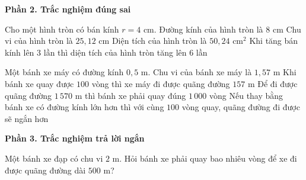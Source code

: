 \textbf{Phần 2. Trắc nghiệm đúng sai}

\begin{ex} %
Cho một hình tròn có bán kính $r = 4\text{ cm}$.
\choiceTF
{\True Đường kính của hình tròn là $8\text{ cm}$}
{\True Chu vi của hình tròn là $25{,}12\text{ cm}$}
{\True Diện tích của hình tròn là $50{,}24\text{ cm}^2$}
{Khi tăng bán kính lên $3$ lần thì diện tích của hình tròn tăng lên $6$ lần}
\end{ex}

\begin{ex} %
Một bánh xe máy có đường kính $0{,}5\text{ m}$.
\choiceTF
{\True Chu vi của bánh xe máy là $1{,}57\text{ m}$}
{\True Khi bánh xe quay được $100$ vòng thì xe máy đi được quãng đường $157\text{ m}$}
{\True Để đi được quãng đường $1\,570\text{ m}$ thì bánh xe phải quay đúng $1\,000$ vòng}
{Nếu thay bằng bánh xe có đường kính lớn hơn thì với cùng $100$ vòng quay, quãng đường đi được sẽ ngắn hơn}
\end{ex}

\textbf{Phần 3. Trắc nghiệm trả lời ngắn}

\begin{ex} %
Một bánh xe đạp có chu vi $2\text{ m}$. Hỏi bánh xe phải quay bao nhiêu vòng để xe đi được quãng đường dài $500\text{ m}$?
\end{ex}


